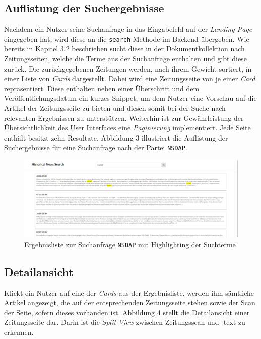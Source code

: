 \documentclass[11pt,a4paper, halfparskip]{scrartcl}
\begin{document}
\subsection{Auflistung der Suchergebnisse}

Nachdem ein Nutzer seine Suchanfrage in das Eingabefeld auf der \textit{Landing Page} eingegeben hat, wird diese an die \texttt{search}-Methode im Backend übergeben.
Wie bereits in Kapitel 3.2 beschrieben sucht diese in der Dokumentkollektion nach Zeitungsseiten, welche die Terme aus der Suchanfrage enthalten und gibt diese zurück. 
Die zurückgegebenen Zeitungen werden, nach ihrem Gewicht sortiert, in einer Liste von \textit{Cards} dargestellt.
Dabei wird eine Zeitungsseite von je einer \textit{Card} repräsentiert.
Diese enthalten neben einer Überschrift und dem Veröffentlichungsdatum ein kurzes Snippet, um dem Nutzer eine Vorschau auf die Artikel der Zeitungsseite zu bieten und diesen somit bei der Suche nach relevanten Ergebnissen zu unterstützen.
Weiterhin ist zur Gewährleistung der Übersichtlichkeit des User Interfaces eine \textit{Paginierung} implementiert.
Jede Seite enthält besitzt zehn Resultate. 
Abbildung 3 illustriert die Auflistung der Suchergebnisse für eine Suchanfrage nach der Partei \texttt{NSDAP}.

\begin{figure}[h]
	\includegraphics[width=\linewidth]{images/resultlist-view.png}
	\caption{Ergebnisliste zur Suchanfrage \texttt{NSDAP} mit Highlighting der Suchterme}
\end{figure}

\subsection{Detailansicht}

Klickt ein Nutzer auf eine der \textit{Cards} aus der Ergebnisliste, werden ihm sämtliche Artikel angezeigt, die auf der entsprechenden Zeitungsseite stehen sowie der Scan der Seite, sofern dieses vorhanden ist.
Abbildung 4 stellt die Detailansicht einer Zeitungsseite dar.
Darin ist die \textit{Split-View} zwischen Zeitungsscan und -text zu erkennen.
\end{document}
